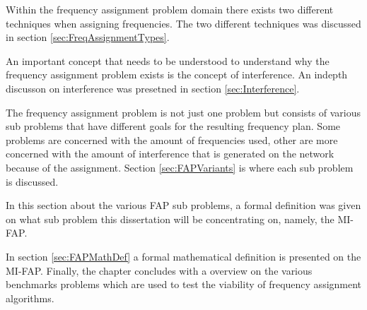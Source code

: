 Within the frequency assignment problem domain there exists two different techniques when assigning frequencies. The two different techniques was discussed in section \ref{sec:FreqAssignmentTypes}. 

An important concept that needs to be understood to understand why the frequency assignment problem exists is the concept of interference. An indepth discusson on interference was presetned in section \ref{sec:Interference}.

The frequency assignment problem is not just one problem but consists of various sub problems that have different goals for the resulting frequency plan. Some problems are concerned with the amount of frequencies used, other are more concerned with the amount of interference that is generated on the network because of the assignment. Section \ref{sec:FAPVariants} is where each sub problem is discussed. 

In this section about the various FAP sub problems, a formal definition was given on what sub problem this dissertation will be concentrating on, namely, the MI-FAP.

In section \ref{sec:FAPMathDef} a formal mathematical definition is presented on the MI-FAP.  Finally, the chapter concludes with a overview on the various benchmarks problems which are used to test the viability of frequency assignment algorithms.

